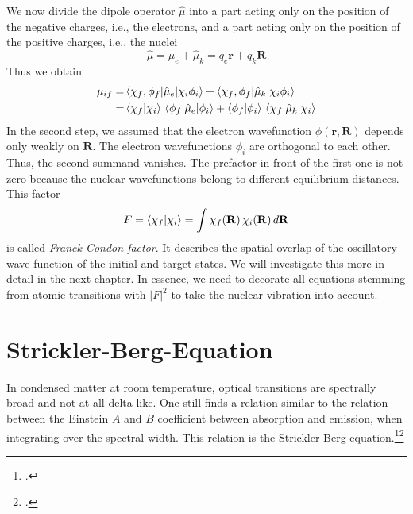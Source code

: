 We now divide the dipole operator $\hat{\mu}$ into a part acting only on the position of the negative charges, i.e., the electrons, and a part acting only on the position of the positive charges, i.e., the nuclei
\begin{equation}
\hat{\mu} = \hat{\mu}_e + \hat{\mu}_k = q_e \mathbf{r} + q_k \mathbf{R}
\end{equation}
Thus we obtain
\begin{align}
\mu_{if} = & \braket{ \chi_f, \phi_f | \hat{\mu}_e | \chi_i \phi_i} 
+ \braket{ \chi_f, \phi_f | \hat{\mu}_k | \chi_i \phi_i}  \\
= & \braket{\chi_f | \chi_i} \, \braket{ \phi_f | \hat{\mu}_e | \phi_i} 
+ \braket{ \phi_f | \phi_i} \,
\braket{ \chi_f | \hat{\mu}_k | \chi_i }  
\end{align} 
In the second step, we assumed that the electron wavefunction $ \phi(\mathbf{r}, \mathbf{R})$ depends only weakly on $\mathbf{R}$. The electron wavefunctions $\phi_i$ are orthogonal to each other. Thus, the second summand vanishes. The prefactor in front of the first one is not zero because the nuclear wavefunctions belong to different equilibrium distances. This factor 
\begin{equation}
 F = \braket{\chi_f | \chi_i} = 
 \int \chi_f(\mathbf{R}) \, \chi_i(\mathbf{R}) \, d \mathbf{R} 
\end{equation}
is called \emph{Franck-Condon factor}. It describes the spatial overlap of the oscillatory wave function of the initial and target states.
We will investigate this more in detail in the next chapter. In essence, we need to decorate all equations stemming from atomic transitions with $|F|^2$ to take the nuclear vibration into account.



\section{Strickler-Berg-Equation} 


In condensed matter at room temperature, optical transitions are spectrally broad and not at all delta-like. One still finds a relation similar to the relation between the Einstein $A$ and $B$ coefficient between absorption and emission, when integrating over the spectral width. This relation is the  Strickler-Berg equation.\footcite[chapter 5.3][]{Strickler_Berg, Parson}\footcite[chapter 
1.4.3.2]{KoehlerBaessler2015}


